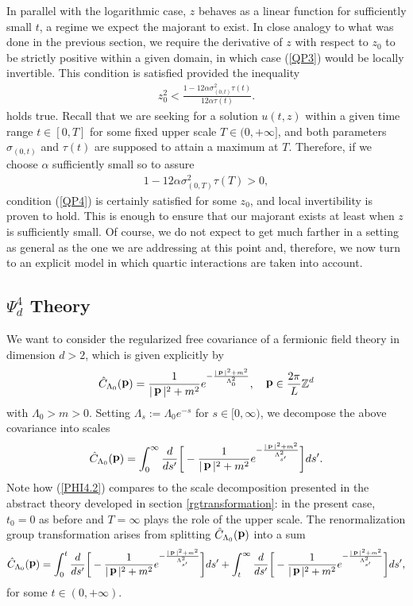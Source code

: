 \documentclass[12pt,twoside]{amsart}
\newcommand{\beq}{\begin{equation}}
\newcommand{\eeq}{\end{equation}}
\numberwithin{equation}{section}
\DeclareMathOperator{\pp}{{\bf{p}}}
\begin{document}
In parallel with the logarithmic case, $z$ behaves as a linear function for sufficiently small $t$, a regime we expect the majorant to exist. In close analogy to what was done in the previous section, we require the derivative of $z$ with respect to $z_{0}$ to be strictly positive within a given domain, in which case (\ref{QP3}) would be locally invertible. This condition is satisfied provided the inequality 
\begin{eqnarray}
z_{0}^{2} < \frac{1-12\alpha \sigma_{(0,t)}^{2}\tau(t)}{12\alpha \tau(t)}. \label{QP4}
\end{eqnarray}
holds true. Recall that we are seeking for a solution $u(t,z)$ within a given time range $t \in [0,T]$ for some fixed upper scale $T \in (0,+\infty]$, and both parameters $\sigma_{(0,t)}$ and $\tau(t)$ are supposed to attain a maximum at $T$. Therefore, if we choose $\alpha$ sufficiently small so to assure
\begin{eqnarray}
1-12\alpha \sigma_{(0,T)}^{2}\tau(T) > 0, \label{QP6}
\end{eqnarray}
condition (\ref{QP4}) is certainly satisfied for some $z_{0}$, and local invertibility is proven to hold. This is enough to ensure that our majorant exists at least when $z$ is sufficiently small. Of course, we do not expect to get much farther in a setting as general as the one we are addressing at this point and, therefore, we now turn to an explicit model in which quartic interactions are taken into account. 


\subsection{$\Psi^{4}_{d}$ Theory}\label{phi4d}

We want to consider the regularized free covariance of a fermionic field theory in dimension $d >2$, which is given explicitly by
\begin{eqnarray}
\hat{C}_{\Lambda_{0}}(\pp) = \frac{1}{|\pp|^{2}+m^{2}}e^{-\frac{|\pp|^{2}+m^{2}}{\Lambda_{0}^{2}}}, \quad \pp \in \frac{2\pi}{L}\mathbb{Z}^{d} \label{PHI4.1}
\end{eqnarray}
with $\Lambda_{0} > m > 0$. Setting $\Lambda_{s}:= \Lambda_{0}e^{-s}$ for $s \in [0,\infty)$, we decompose the above covariance into scales
\begin{eqnarray}
\hat{C}_{\Lambda_{0}}(\pp) = \int_{0}^{\infty}\frac{d}{ds'}\bigg{[}-\frac{1}{|\pp|^{2}+m^{2}}e^{-\frac{|\pp|^{2}+m^{2}}{\Lambda_{s'}^{2}}}\bigg{]}ds'. \label{PHI4.2}
\end{eqnarray}
Note how (\ref{PHI4.2}) compares to the scale decomposition presented in the abstract theory developed in section \ref{rgtransformation}: in the present case, $t_{0} = 0$ as before and $T = \infty$ plays the role of the upper scale. The renormalization group transformation arises from splitting $\hat{C}_{\Lambda_{0}}(\pp)$ into a sum
\beq
\hat{C}_{\Lambda_{0}}(\pp) = \int_{0}^{t}\frac{d}{ds'}\bigg{[}-\frac{1}{|\pp|^{2}+m^{2}}e^{-\frac{|\pp|^{2}+m^{2}}{\Lambda_{s'}^{2}}}\bigg{]}ds' + \int_{t}^{\infty}\frac{d}{ds'}\bigg{[}-\frac{1}{|\pp|^{2}+m^{2}}e^{-\frac{|\pp|^{2}+m^{2}}{\Lambda_{s'}^{2}}}\bigg{]}ds', \label{PHI4.3}
\eeq
for some $t \in (0,+\infty)$.
\end{document}
